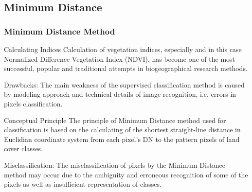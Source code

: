 \documentclass[pdflatex,compress,8pt,
	xcolor={dvipsnames,dvipsnames,svgnames,x11names,table},
	hyperref={colorlinks = true,breaklinks = true, urlcolor = NavyBlue, breaklinks = true}]{beamer}
\begin{document}
\subsection{Minimum Distance}
\begin{frame}\frametitle{Minimum Distance Method}

\begin{alertblock}{Calculating Indices}
Calculation of vegetation indices, especially and in this case Normalized Difference Vegetation Index (NDVI), has become one of the most successful, popular and traditional attempts in biogeographical research methods.
\end{alertblock}

\begin{examples}{Drawbacks:}
The main weakness of the supervised classification method is caused by modeling approach and technical details of image recognition, i.e. errors in pixels classification.
\end{examples}

\begin{block}{Conceptual Principle}
The principle of Minimum Distance method used for classification is based on the calculating of the shortest straight-line distance in Euclidian coordinate system from each pixel’s DN to the pattern pixels of land cover classes.
\end{block}

\begin{examples}{Misclassification:}
The misclassification of pixels by the Minimum Distance method may occur due to the ambiguity and erroneous recognition of some of the pixels as well as insufficient representation of classes.
\end{examples}

\end{frame}
\end{document}
